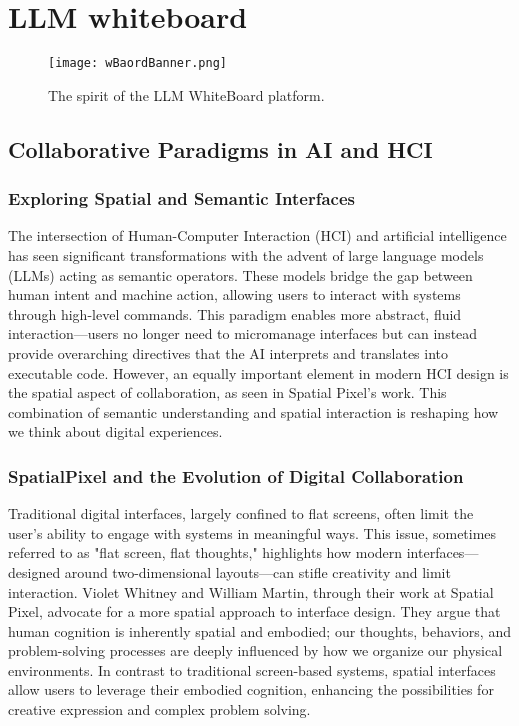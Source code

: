 \section{LLM whiteboard}

\begin{figure}[!h]
    \centering
    \texttt{[image: wBaordBanner.png]}
    \caption{The spirit of the LLM WhiteBoard platform.}
    \vspace{0.1cm}
    \label{fig:spiritofWB}
\end{figure}

\subsection{Collaborative Paradigms in AI and HCI}

\subsubsection{Exploring Spatial and Semantic Interfaces}
The intersection of Human-Computer Interaction (HCI) and artificial intelligence has seen significant transformations with the advent of large language models (LLMs) acting as semantic operators.
These models bridge the gap between human intent and machine action, allowing users to interact with systems through high-level commands.
This paradigm enables more abstract, fluid interaction—users no longer need to micromanage interfaces but can instead provide overarching directives that the AI interprets and translates into executable code.
However, an equally important element in modern HCI design is the spatial aspect of collaboration, as seen in Spatial Pixel's work.
This combination of semantic understanding and spatial interaction is reshaping how we think about digital experiences.

\subsubsection{SpatialPixel and the Evolution of Digital Collaboration}
Traditional digital interfaces, largely confined to flat screens, often limit the user’s ability to engage with systems in meaningful ways.
This issue, sometimes referred to as "flat screen, flat thoughts,"\cite{whitney2024} highlights how modern interfaces—designed around two-dimensional layouts—can stifle creativity and limit interaction.
Violet Whitney and William Martin, through their work at Spatial Pixel, advocate for a more spatial approach to interface design.
They argue that human cognition is inherently spatial and embodied; our thoughts, behaviors, and problem-solving processes are deeply influenced by how we organize our physical environments.
In contrast to traditional screen-based systems, spatial interfaces allow users to leverage their embodied cognition, enhancing the possibilities for creative expression and complex problem solving.

